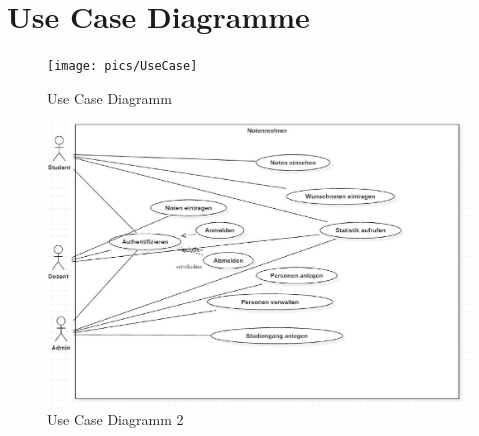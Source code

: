 \documentclass[12pt,a4paper,parskip]{scrreprt}
\begin{document}
\section{Use Case Diagramme}
\begin{figure}[!h]
\centering
\texttt{[image: pics/UseCase]}
\caption[Use Case Diagramm]{Use Case Diagramm}
\label{fig:UseCase}
\end{figure}
\begin{figure}[!h]
\centering
\includegraphics[width=1\linewidth]{pics/UseCase2}
\caption[Use Case Diagramm]{Use Case Diagramm 2}
\label{fig:UseCase2}
\end{figure}
\end{document}
